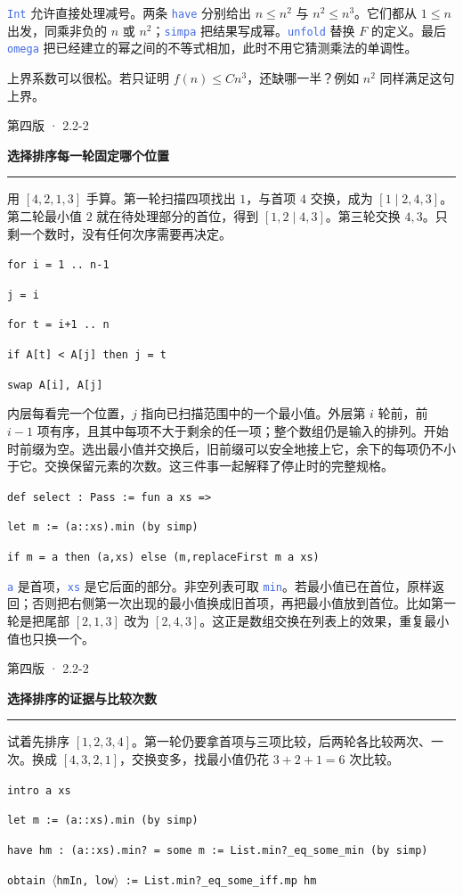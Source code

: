 \documentclass[UTF8,11pt,a4paper,fontset=fandol]{ctexart}
\newcommand{\HandoutLesson}[2]{%
  \par{\small\heiti\color{BrickRed}#1}\par\vspace{3pt}
  {\fontsize{21}{27}\selectfont\heiti\bfseries #2}\par
  \textcolor{BrickRed}{\rule{\linewidth}{.7pt}}\par}
\newcommand{\HandoutBox}[1]{%
  \par\noindent\begingroup\setlength{\fboxsep}{8pt}%
  \colorbox{BrickRed!9}{\parbox{\dimexpr\linewidth-16pt\relax}{#1}}\endgroup\par}
\newcommand{\src}[1]{\textcolor{RoyalBlue}{\texttt{#1}}}
\newcommand{\subhead}[1]{\par\vspace{3pt}{\heiti\bfseries\color{RoyalBlue}#1}\par}
\newenvironment{leanblock}{\par\smallskip\noindent\begin{lrbox}{\leanbox}\begin{minipage}{\dimexpr\linewidth-12pt\relax}\raggedright\small\setlength{\parskip}{0pt}}{\end{minipage}\end{lrbox}\colorbox{RoyalBlue!6}{\usebox{\leanbox}}\par\smallskip}
\newcommand{\lineofcode}[2]{\noindent\hspace*{#1em}\strut\texttt{#2}\par}
\begin{document}
\src{Int} 允许直接处理减号。两条 \src{have} 分别给出 $n\le n^2$ 与 $n^2\le n^3$。它们都从 $1\le n$ 出发，同乘非负的 $n$ 或 $n^2$；\src{simpa} 把结果写成幂。\src{unfold} 替换 $F$ 的定义。最后 \src{omega} 把已经建立的幂之间的不等式相加，此时不用它猜测乘法的单调性。
\HandoutBox{上界系数可以很松。若只证明 $f(n)\le Cn^3$，还缺哪一半？例如 $n^2$ 同样满足这句上界。}
\par{}
\clearpage{}\label{p26}\HandoutLesson{第四版 · 2.2-2}{选择排序每一轮固定哪个位置}
用 $[4,2,1,3]$ 手算。第一轮扫描四项找出 $1$，与首项 $4$ 交换，成为 $[1\mid 2,4,3]$。第二轮最小值 $2$ 就在待处理部分的首位，得到 $[1,2\mid 4,3]$。第三轮交换 $4,3$。只剩一个数时，没有任何次序需要再决定。
\subhead{写成循环}
\begin{leanblock}
\lineofcode{0.0}{for i = 1 .. n-1}
\lineofcode{0.9}{j = i}
\lineofcode{0.9}{for t = i+1 .. n}
\lineofcode{1.8}{if A[t] < A[j] then j = t}
\lineofcode{0.9}{swap A[i], A[j]}
\end{leanblock}
内层每看完一个位置，$j$ 指向已扫描范围中的一个最小值。外层第 $i$ 轮前，前 $i-1$ 项有序，且其中每项不大于剩余的任一项；整个数组仍是输入的排列。开始时前缀为空。选出最小值并交换后，旧前缀可以安全地接上它，余下的每项仍不小于它。交换保留元素的次数。这三件事一起解释了停止时的完整规格。
\begin{leanblock}
\lineofcode{0.0}{def select : Pass := fun a xs =>}
\lineofcode{0.9}{let m := (a::xs).min (by simp)}
\lineofcode{0.9}{if m = a then (a,xs) else (m,replaceFirst m a xs)}
\end{leanblock}
\src{a} 是首项，\src{xs} 是它后面的部分。非空列表可取 \src{min}。若最小值已在首位，原样返回；否则把右侧第一次出现的最小值换成旧首项，再把最小值放到首位。比如第一轮是把尾部 $[2,1,3]$ 改为 $[2,4,3]$。这正是数组交换在列表上的效果，重复最小值也只换一个。
\par{}
\clearpage{}\label{p27}\HandoutLesson{第四版 · 2.2-2}{选择排序的证据与比较次数}
试着先排序 $[1,2,3,4]$。第一轮仍要拿首项与三项比较，后两轮各比较两次、一次。换成 $[4,3,2,1]$，交换变多，找最小值仍花 $3+2+1=6$ 次比较。
\subhead{Lean 如何拼接一次选择的证明}
\begin{leanblock}
\lineofcode{0.9}{intro a xs}
\lineofcode{0.9}{let m := (a::xs).min (by simp)}
\lineofcode{0.9}{have hm : (a::xs).min? = some m := List.min?\_eq\_some\_min (by simp)}
\lineofcode{0.9}{obtain \ensuremath{\langle}hmIn, low\ensuremath{\rangle} := List.min?\_eq\_some\_iff.mp hm}
\end{leanblock}
\end{document}
